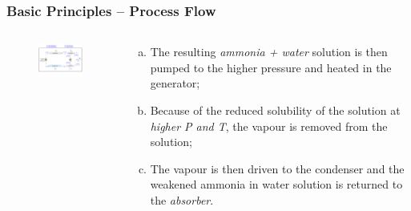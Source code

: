 \documentclass[10pt,compress]{beamer}
\begin{document}
\begin{frame}
 \frametitle{Basic Principles -- Process Flow} 
  \begin{columns}
   \begin{column}[c]{0.45\linewidth}
    \begin{figure}%
     \includegraphics[width=5.5cm,clip]{./Pics/Overview_Refrig32}
    \end{figure}  
   \end{column}  
   \begin{column}[c]{0.55\linewidth}
    \begin{enumerate}[(a)]
     \item <1-> The resulting {\it ammonia + water} solution is then pumped to the higher pressure and heated in the generator;
     \item <2-> Because of the reduced solubility of the solution at {\it higher P and T}, the vapour is removed from the solution;
     \item <3-> The vapour is then driven to the condenser and the weakened ammonia in water solution is returned to the {\it absorber}.
   \end{enumerate}
  \end{column}  
 \end{columns}  
\end{frame}
\end{document}
